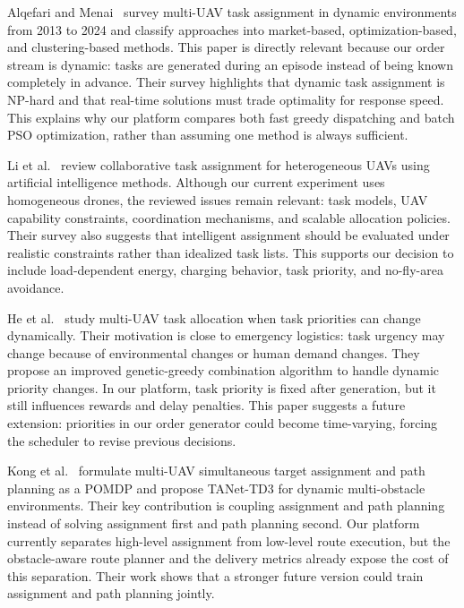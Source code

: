 \documentclass[sigconf,balance=false]{aamas}
\begin{document}
Alqefari and Menai~\cite{dynamicuavsurvey2025} survey multi-UAV task assignment in dynamic environments from 2013 to 2024 and classify approaches into market-based, optimization-based, and clustering-based methods. This paper is directly relevant because our order stream is dynamic: tasks are generated during an episode instead of being known completely in advance. Their survey highlights that dynamic task assignment is NP-hard and that real-time solutions must trade optimality for response speed. This explains why our platform compares both fast greedy dispatching and batch PSO optimization, rather than assuming one method is always sufficient.

Li et al.~\cite{heterouavsurvey2024} review collaborative task assignment for heterogeneous UAVs using artificial intelligence methods. Although our current experiment uses homogeneous drones, the reviewed issues remain relevant: task models, UAV capability constraints, coordination mechanisms, and scalable allocation policies. Their survey also suggests that intelligent assignment should be evaluated under realistic constraints rather than idealized task lists. This supports our decision to include load-dependent energy, charging behavior, task priority, and no-fly-area avoidance.

He et al.~\cite{dynamicpriority2024} study multi-UAV task allocation when task priorities can change dynamically. Their motivation is close to emergency logistics: task urgency may change because of environmental changes or human demand changes. They propose an improved genetic-greedy combination algorithm to handle dynamic priority changes. In our platform, task priority is fixed after generation, but it still influences rewards and delay penalties. This paper suggests a future extension: priorities in our order generator could become time-varying, forcing the scheduler to revise previous decisions.

Kong et al.~\cite{frontiers2023uav} formulate multi-UAV simultaneous target assignment and path planning as a POMDP and propose TANet-TD3 for dynamic multi-obstacle environments. Their key contribution is coupling assignment and path planning instead of solving assignment first and path planning second. Our platform currently separates high-level assignment from low-level route execution, but the obstacle-aware route planner and the delivery metrics already expose the cost of this separation. Their work shows that a stronger future version could train assignment and path planning jointly.
\end{document}

